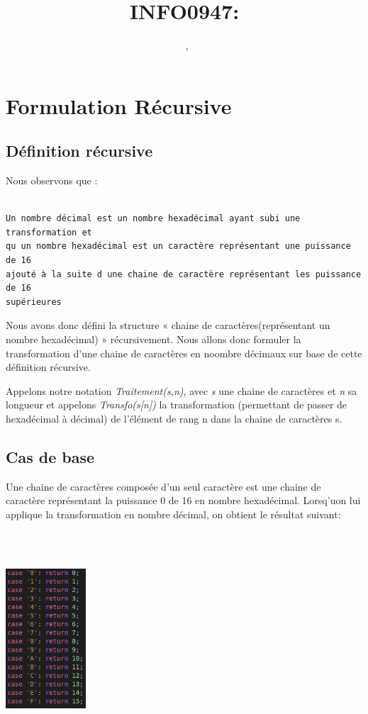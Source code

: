 \documentclass[a4paper, 11pt, oneside]{article}
\title{INFO0947: \intitule}
\author{\textsc{\Prenom}~\textsc{\Nom}, \matricule}
\date{}
\newcommand{\tablemat}{~}
\renewcommand{\tablemat}{\tableofcontents}
\begin{document}
\maketitle
\newpage
\tablemat
\newpage


\section{Formulation Récursive}\label{formulation}
\subsection{Définition récursive}
Nous observons que :

\begin{lstlisting}

Un nombre décimal est un nombre hexadécimal ayant subi une transformation et 
qu un nombre hexadécimal est un caractère représentant une puissance de 16
ajouté à la suite d une chaine de caractère représentant les puissance de 16
supérieures

\end{lstlisting}

Nous avons donc défini la structure « chaine de caractères(représentant un nombre
hexadécimal) »  récursivement. Nous allons donc formuler la transformation d’une
chaine de caractères en noombre décimaux sur base de cette définition récursive.

Appelons notre notation \textit{Traitement(s,n)}, avec \textit{s} une chaine de
caractères et \textit{n} sa longueur et appelons \textit{Transfo(s[n])} la 
transformation (permettant de passer de hexadécimal à décimal) de l'élément de 
rang n dans la chaine de caractères s.

\subsection{Cas de base}

Une chaine de caractères composée d'un seul caractère est une chaine de caractère
représentant la puissance 0 de 16 en nombre hexadécimal.
Lorsq'uon lui applique la transformation en nombre décimal, on obtient le résultat suivant: 

\centerline{\includegraphics[height=8cm, width=3cm]{AA.png}}
\end{document}
